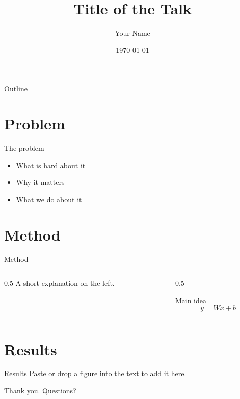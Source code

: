 \documentclass[aspectratio=169]{beamer}
\title{Title of the Talk}
\author{Your Name}
\institute{University}
\date{\today}
\begin{document}
\begin{frame}
  \titlepage
\end{frame}

\begin{frame}{Outline}
  \tableofcontents
\end{frame}

\section{Problem}

\begin{frame}{The problem}
  \begin{itemize}
    \item What is hard about it
    \item Why it matters
    \pause
    \item What we do about it
  \end{itemize}
\end{frame}

\section{Method}

\begin{frame}{Method}
  \begin{columns}
    \begin{column}{0.5\textwidth}
      A short explanation on the left.
    \end{column}
    \begin{column}{0.5\textwidth}
      \begin{block}{Main idea}
        \[ y = Wx + b \]
      \end{block}
    \end{column}
  \end{columns}
\end{frame}

\section{Results}

\begin{frame}{Results}
  Paste or drop a figure into the text to add it here.
\end{frame}

\begin{frame}
  \centering \Large Thank you. Questions?
\end{frame}
\end{document}
